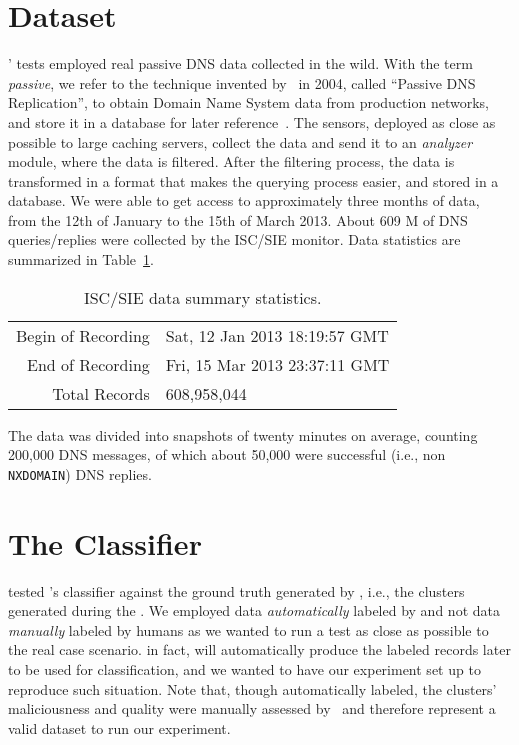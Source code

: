 \section{Dataset} %
\label{sec:dataset}
' tests employed real passive DNS data collected in the
wild. With the term \emph{passive}, we refer to the technique invented
by~\citet{weimer2005passive} in 2004, called ``Passive DNS Replication'', to obtain
Domain Name System data from production networks, and store it in a database
for later reference~\cite{weimer2005passive}.
The sensors, deployed as close as possible to large caching servers, collect the
data and send it to an \emph{analyzer} module, where the data is filtered.
After the filtering process, the data is transformed in a format that makes
the querying process easier, and stored in a database.
We were able to get access to approximately three months of data, from the 12th
of January to the 15th of March 2013. About 609 M of DNS queries/replies were
collected by the ISC/SIE monitor. Data statistics are summarized in Table~\ref{tab:stats}.
\begin{table}[h!tp]
\centering
\begin{tabular}{rl}
Begin of Recording & Sat, 12 Jan 2013 18:19:57 GMT \\
End of Recording   & Fri, 15 Mar 2013 23:37:11 GMT \\
Total Records      & 608,958,044 \\
\end{tabular}
\caption{ISC/SIE data summary statistics.}
\label{tab:stats}
\end{table}
The data was divided into snapshots of twenty minutes on average, counting
200,000 DNS messages, of which about 50,000 were successful (i.e., non \texttt{NXDOMAIN})
DNS replies.
\section{The Classifier} %
\label{sec:the_classifier}
 tested \thesystem's classifier against the ground truth
generated by \phoenix, i.e., the clusters generated during the . We employed data \emph{automatically} labeled by \thesystem and
not data \emph{manually} labeled by humans as we wanted to run a test as close
as possible to the real case scenario. \thesystem in fact, will automatically
produce the labeled records later to be used for classification, and we wanted
to have our experiment set up to reproduce such situation. Note that, though
automatically labeled, the clusters' maliciousness and quality were manually
assessed by~\citet{schiavoni2013} and therefore represent a valid dataset to
run our experiment.

